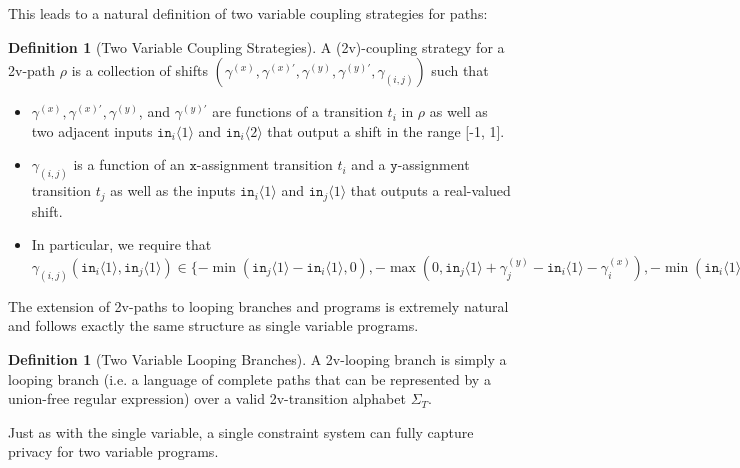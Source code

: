 \documentclass[12pt]{article}
\newcommand{\brangle}[1]{\langle#1 \rangle}
\theoremstyle{definition}
\newtheorem{defn}[thm]{Definition}
\begin{document}
This leads to a natural definition of two variable coupling strategies for paths:

\begin{defn}[Two Variable Coupling Strategies]
    A (2v)-coupling strategy for a 2v-path $\rho$ is a collection of shifts $(\gamma^{(x)}, \gamma^{(x)\prime}, \gamma^{(y)}, \gamma^{(y)\prime}, \gamma_{(i, j)})$ such that \begin{itemize}
        \item $\gamma^{(x)}, \gamma^{(x)\prime}, \gamma^{(y)}$, and $\gamma^{(y)\prime}$ are functions of a transition $t_i$ in $\rho$ as well as two adjacent inputs $\texttt{in}_i\brangle{1}$ and $\texttt{in}_i\brangle{2}$ that output a shift in the range [-1, 1]. 
        \item $\gamma_{(i, j)}$ is a function of an $\texttt{x}$-assignment transition $t_i$ and a $\texttt{y}$-assignment transition $t_j$ as well as the inputs $\texttt{in}_{i}\brangle{1}$ and $\texttt{in}_j\brangle{1}$ that outputs a real-valued shift. 
        \item In particular, we require that $\gamma_{(i, j)}(\texttt{in}_{i}\brangle{1},\texttt{in}_{j}\brangle{1}) \in \{-\min(\texttt{in}_{j}\brangle{1}-\texttt{in}_{i}\brangle{1}, 0),-\max(0, \texttt{in}_{j}\brangle{1}+ \gamma_{j}^{(y)}-\texttt{in}_{i}\brangle{1}-\gamma_{i}^{(x)}), -\min(\texttt{in}_{i}\brangle{1}-\texttt{in}_{j}\brangle{1}, 0), -\max(0, \texttt{in}_{i}\brangle{1}+ \gamma_{i}^{(x)}-\texttt{in}_{j}\brangle{1}-\gamma_{j}^{(y)})\}$
    \end{itemize}
\end{defn}

The extension of 2v-paths to looping branches and programs is extremely natural and follows exactly the same structure as single variable programs. 

\begin{defn}[Two Variable Looping Branches]
    A 2v-looping branch is simply a looping branch (i.e. a language of complete paths that can be represented by a union-free regular expression) over a valid 2v-transition alphabet $\Sigma_T$.
\end{defn}

Just as with the single variable, a single constraint system can fully capture privacy for two variable programs.
\end{document}
